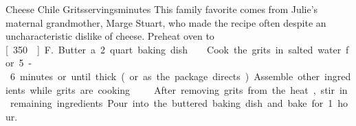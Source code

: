 \begin{recipe}{Cheese Chile Grits}{\unit[6]{servings}}{\unit[90]{minutes}}
\freeform This family favorite comes from Julie's maternal grandmother, Marge Stuart, who made the recipe often despite an uncharacteristic dislike of cheese.
\newstep Preheat oven to \unit[350\0]{F.} Butter a 2 quart baking dish.
Cook the grits in salted water for 5-6 minutes or until thick (or as the package directs). Assemble other ingredients while grits are cooking.
After removing grits from the heat, stir in remaining ingredients. Pour into the buttered baking dish and bake for 1 hour.
\end{recipe}
